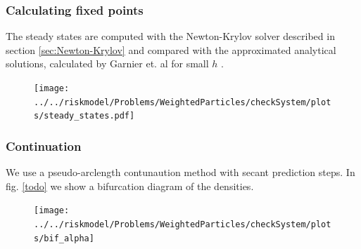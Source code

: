 \documentclass[]{article}
\theoremstyle{definition}
\begin{document}

\subsubsection{Calculating fixed points}
The steady  states are computed with the Newton-Krylov solver described in section \ref{sec:Newton-Krylov} and compared with the approximated analytical solutions, calculated by Garnier et. al for small $h$ \cite{Garnier}.



\begin{center}
\begin{figure}
\texttt{[image: ../../riskmodel/Problems/WeightedParticles/checkSystem/plots/steady\_states.pdf]}
\caption{\label{fig:bif_anal}}
\end{figure}
\end{center}



\subsubsection{Continuation}
We use a pseudo-arclength contunaution method with secant prediction steps.
In fig. \ref{todo} we show a bifurcation diagram of the densities. 





\begin{center}
\begin{figure}
\texttt{[image: ../../riskmodel/Problems/WeightedParticles/checkSystem/plots/bif\_alpha]}
\caption{\label{fig:bif_anal}}
\end{figure}
\end{center}
\end{document}
